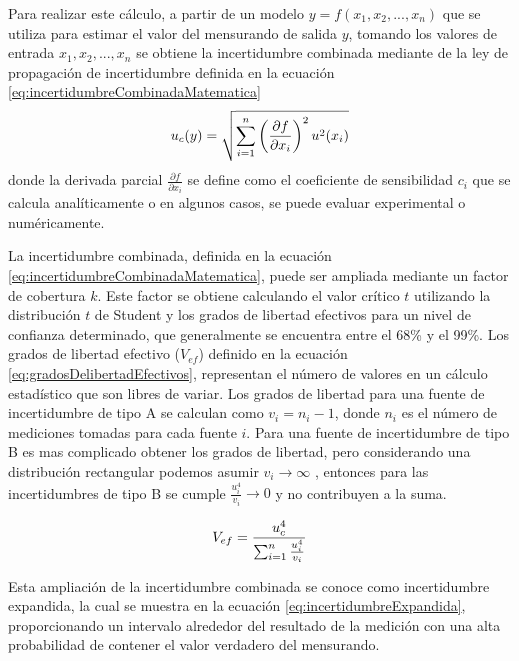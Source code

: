 Para realizar este cálculo, a partir de un modelo $y = f(x_{1},x_{2}, ..., x_{n})$ que se utiliza para estimar el valor del mensurando de salida $y$, tomando los valores de entrada $x_{1},x_{2}, ..., x_{n}$ se obtiene la incertidumbre combinada mediante de la ley de propagación de incertidumbre definida en la ecuación \ref{eq:incertidumbreCombinadaMatematica}
\begin{equation}
    \centering
    u_{c}(y) = \sqrt{\sum_{i=1}^{n} \left( \frac{\partial f}{\partial x_{i}} \right)^2 u^2(x_i)}
    \label{eq:incertidumbreCombinadaMatematica}
\end{equation}
donde la derivada parcial $\frac{\partial f}{\partial x_{i}}$ se define como el coeficiente de sensibilidad $c_{i}$ que se calcula analíticamente o en algunos casos, se puede evaluar experimental o numéricamente.

La incertidumbre combinada, definida en la ecuación \ref{eq:incertidumbreCombinadaMatematica}, puede ser ampliada mediante un factor de cobertura $k$. Este factor se obtiene calculando el valor crítico $t$ utilizando la distribución $t$ de Student y los grados de libertad efectivos para un nivel de confianza determinado, que generalmente se encuentra entre el 68\% y el 99\%. Los grados de libertad efectivo ($V_{ef}$) definido en la ecuación \ref{eq:gradosDelibertadEfectivos}, representan el número de valores en un cálculo estadístico que son libres de variar. Los grados de libertad para una fuente de incertidumbre de tipo A se calculan como  $v_{i}= n_{i}-1$, donde $n_{i}$ es el número de mediciones tomadas para cada fuente $i$. Para una fuente de incertidumbre de tipo B es mas complicado obtener los grados de libertad, pero considerando una distribución rectangular podemos asumir $v_{i} \rightarrow \infty$ \cite{Workshop_WMO2021}, entonces para las incertidumbres de tipo B se cumple $\frac{u_i^4}{v_i} \rightarrow 0 $ y no contribuyen a la suma.


\begin{equation}
    \centering
    V_{ef} = \frac{u_c^4}{\sum_{i=1}^{n} \frac{u_i^4}{v_i}}
    \label{eq:gradosDelibertadEfectivos}
\end{equation}


Esta ampliación de la incertidumbre combinada se conoce como incertidumbre expandida, la cual se muestra en la ecuación \ref{eq:incertidumbreExpandida}, proporcionando un intervalo alrededor del resultado de la medición con una alta probabilidad de contener el valor verdadero del mensurando.



